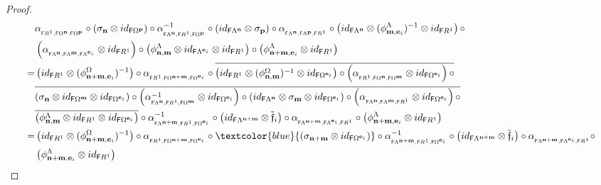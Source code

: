 \documentclass[12pt]{amsart}
\newcommand{\N}{\mathbf{n}}
\newcommand{\M}{\mathbf{m}}
\theoremstyle{definition}
\theoremstyle{remark}
\begin{document}
\begin{proof}
{\begin{align*}
    &\alpha_{_{\mathsf{F}R^1,\mathsf{F}\Omega^\N,\mathsf{F}\Omega^\mathbf{p}}}\circ \left(\sigma_\N\otimes id_{\mathsf{F}\Omega^\mathbf{p}}\right)\circ \alpha_{_{\mathsf{F}\Lambda^\N,\mathsf{F}R^1,\mathsf{F}\Omega^\mathbf{p}}}^{-1}\circ \left(id_{\mathsf{F}\Lambda^\N}\otimes \sigma_\mathbf{p}\right)\circ \alpha_{_{\mathsf{F}\Lambda^\N,\mathsf{F}\Lambda^\mathbf{p},\mathsf{F}R^1}}\circ \left(id_{\mathsf{F}\Lambda^\N}\otimes (\phi_{\M,\mathbf{e}_i}^\Lambda)^{-1}\otimes id_{\mathsf{F}R^1}\right)\circ\\   &\left(\alpha_{_{\mathsf{F}\Lambda^\N,\mathsf{F}\Lambda^\M,\mathsf{F}\Lambda^{\mathbf{e}_i}}}\otimes id_{\mathsf{F}R^1}\right)\circ \left(\phi_{\N,\M}^\Lambda\otimes id_{\mathsf{F}\Lambda^{\mathbf{e}_i}}\otimes id_{\mathsf{F}R^1}\right)\circ \left(\phi_{\N+\M,\mathbf{e}_i}^\Lambda\otimes id_{\mathsf{F}R^1}\right)\\
    =&\left(id_{\mathsf{F}R^1}\otimes (\phi_{\N+\M,\mathbf{e}_i}^\Omega)^{-1}\right)\circ \alpha_{_{\mathsf{F}R^1,\mathsf{F}\Omega^{\N+\M},\mathsf{F}\Omega^{\mathbf{e}_i}}}\circ \overline{\left(id_{\mathsf{F}R^1}\otimes (\phi_{\N,\M}^\Omega)^{-1}\otimes id_{\mathsf{F}\Omega^{\mathbf{e}_i}}\right)\circ \left(\alpha_{_{\mathsf{F}R^1,\mathsf{F}\Omega^\N,\mathsf{F}\Omega^\M}}\otimes id_{\mathsf{F}\Omega^{\mathbf{e}_i}}\right)\circ}\\
    &\overline{\left(\sigma_\N\otimes id_{\mathsf{F}\Omega^\M}\otimes id_{\mathsf{F}\Omega^{\mathbf{e}_i}}\right)\circ \left(\alpha_{_{\mathsf{F}\Lambda^\N,\mathsf{F}R^1,\mathsf{F}\Omega^\M}}^{-1}\otimes id_{\mathsf{F}\Omega^{\mathbf{e}_i}}\right)\circ \left(id_{\mathsf{F}\Lambda^\N}\otimes \sigma_\M \otimes id_{\mathsf{F}\Omega^{\mathbf{e}_i}}\right)\circ \left(\alpha_{_{\mathsf{F}\Lambda^\N,\mathsf{F}\Lambda^\M,\mathsf{F}R^1}}\otimes id_{\mathsf{F}\Omega^{\mathbf{e}_i}}\right)\circ}\\
    &\overline{\left(\phi_{\N,\M}^\Lambda \otimes id_{\mathsf{F}R^1} \otimes id_{\mathsf{F}\Omega^{\mathbf{e}_i}}\right)}\circ \alpha_{_{\mathsf{F}\Lambda^{\N+\M},\mathsf{F}R^1,\mathsf{F}\Omega^{\mathbf{e}_i}}}^{-1}\circ \left(id_{\mathsf{F}\Lambda^{\N+\M}}\otimes \Tilde{\mathfrak{f}}_i\right)\circ \alpha_{_{\mathsf{F}\Lambda^{\N+\M},\mathsf{F}\Lambda^{\mathbf{e}_i},\mathsf{F}R^1}}\circ \left(\phi_{\N+\M,\mathbf{e}_i}^\Lambda\otimes id_{\mathsf{F}R^1}\right)\\
    =&\left(id_{\mathsf{F}R^1}\otimes (\phi_{\N+\M,\mathbf{e}_i}^\Omega)^{-1}\right)\circ \alpha_{_{\mathsf{F}R^1,\mathsf{F}\Omega^{\N+\M},\mathsf{F}\Omega^{\mathbf{e}_i}}}\circ \textcolor{blue}{\left(\sigma_{\N+\M}\otimes id_{\mathsf{F}\Omega^{\mathbf{e}_i}}\right)}\circ \alpha_{_{\mathsf{F}\Lambda^{\N+\M},\mathsf{F}R^1,\mathsf{F}\Omega^{\mathbf{e}_i}}}^{-1}\circ \left(id_{\mathsf{F}\Lambda^{\N+\M}}\otimes \Tilde{\mathfrak{f}}_i\right)\circ \alpha_{_{\mathsf{F}\Lambda^{\N+\M},\mathsf{F}\Lambda^{\mathbf{e}_i},\mathsf{F}R^1}}\circ\\ &\left(\phi_{\N+\M,\mathbf{e}_i}^\Lambda\otimes id_{\mathsf{F}R^1}\right)\\

\end{align*}}
\end{proof}
\end{document}
